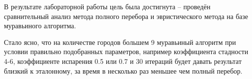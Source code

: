\Conclusion %
В результате лабораторной работы цель была достигнута -- проведён сравнительный анализ метода полного перебора и эвристического метода на базе муравьиного алгоритма.
\par Стало ясно, что на количестве городов большем 9 муравьиный алгоритм при условии правильно подобранных параметров, например коэффициента стадности 4-6, коэффициенте испарения 0.5 или 0.7 и 30 итераций будет давать результат близкий к эталонному, за время в несколько раз меньшее чем полный перебор.